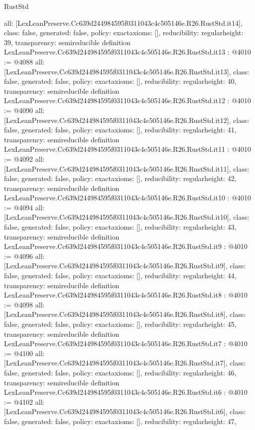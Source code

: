 \begin{lexlean}{RustStd}
\begin{coremodule}
{  all: [LexLeanPreserve.Cc639d244984595f0311043c4c505146e.R26.RustStd.it14],
  class: false,
  generated: false,
  policy: exact{axioms: []},
  reducibility: regular{height: 39},
  transparency: semireducible
}
definition LexLeanPreserve.Cc639d244984595f0311043c4c505146e.R26.RustStd.it13 : @4010 := @4088 {
  all: [LexLeanPreserve.Cc639d244984595f0311043c4c505146e.R26.RustStd.it13],
  class: false,
  generated: false,
  policy: exact{axioms: []},
  reducibility: regular{height: 40},
  transparency: semireducible
}
definition LexLeanPreserve.Cc639d244984595f0311043c4c505146e.R26.RustStd.it12 : @4010 := @4090 {
  all: [LexLeanPreserve.Cc639d244984595f0311043c4c505146e.R26.RustStd.it12],
  class: false,
  generated: false,
  policy: exact{axioms: []},
  reducibility: regular{height: 41},
  transparency: semireducible
}
definition LexLeanPreserve.Cc639d244984595f0311043c4c505146e.R26.RustStd.it11 : @4010 := @4092 {
  all: [LexLeanPreserve.Cc639d244984595f0311043c4c505146e.R26.RustStd.it11],
  class: false,
  generated: false,
  policy: exact{axioms: []},
  reducibility: regular{height: 42},
  transparency: semireducible
}
definition LexLeanPreserve.Cc639d244984595f0311043c4c505146e.R26.RustStd.it10 : @4010 := @4094 {
  all: [LexLeanPreserve.Cc639d244984595f0311043c4c505146e.R26.RustStd.it10],
  class: false,
  generated: false,
  policy: exact{axioms: []},
  reducibility: regular{height: 43},
  transparency: semireducible
}
definition LexLeanPreserve.Cc639d244984595f0311043c4c505146e.R26.RustStd.it9 : @4010 := @4096 {
  all: [LexLeanPreserve.Cc639d244984595f0311043c4c505146e.R26.RustStd.it9],
  class: false,
  generated: false,
  policy: exact{axioms: []},
  reducibility: regular{height: 44},
  transparency: semireducible
}
definition LexLeanPreserve.Cc639d244984595f0311043c4c505146e.R26.RustStd.it8 : @4010 := @4098 {
  all: [LexLeanPreserve.Cc639d244984595f0311043c4c505146e.R26.RustStd.it8],
  class: false,
  generated: false,
  policy: exact{axioms: []},
  reducibility: regular{height: 45},
  transparency: semireducible
}
definition LexLeanPreserve.Cc639d244984595f0311043c4c505146e.R26.RustStd.it7 : @4010 := @4100 {
  all: [LexLeanPreserve.Cc639d244984595f0311043c4c505146e.R26.RustStd.it7],
  class: false,
  generated: false,
  policy: exact{axioms: []},
  reducibility: regular{height: 46},
  transparency: semireducible
}
definition LexLeanPreserve.Cc639d244984595f0311043c4c505146e.R26.RustStd.it6 : @4010 := @4102 {
  all: [LexLeanPreserve.Cc639d244984595f0311043c4c505146e.R26.RustStd.it6],
  class: false,
  generated: false,
  policy: exact{axioms: []},
  reducibility: regular{height: 47},
}
\end{coremodule}
\end{lexlean}
